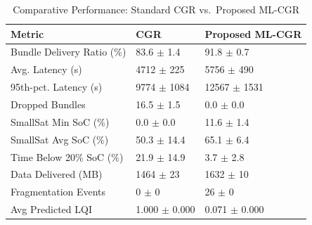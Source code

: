 \begin{table}[t]
\centering
\caption{Comparative Performance: Standard CGR vs.\ Proposed ML-CGR}
\label{tab:results}
\begin{tabular*}{\textwidth}{@{\extracolsep{\fill}}lll}
\hline
\textbf{Metric} & \textbf{CGR} & \textbf{Proposed ML-CGR} \\
\hline
Bundle Delivery Ratio (\%) & 83.6 $\pm$ 1.4 & 91.8 $\pm$ 0.7 \\
Avg. Latency (s) & 4712 $\pm$ 225 & 5756 $\pm$ 490 \\
95th-pct. Latency (s) & 9774 $\pm$ 1084 & 12567 $\pm$ 1531 \\
Dropped Bundles & 16.5 $\pm$ 1.5 & 0.0 $\pm$ 0.0 \\
SmallSat Min SoC (\%) & 0.0 $\pm$ 0.0 & 11.6 $\pm$ 1.4 \\
SmallSat Avg SoC (\%) & 50.3 $\pm$ 14.4 & 65.1 $\pm$ 6.4 \\
Time Below 20\% SoC (\%) & 21.9 $\pm$ 14.9 & 3.7 $\pm$ 2.8 \\
Data Delivered (MB) & 1464 $\pm$ 23 & 1632 $\pm$ 10 \\
Fragmentation Events & 0 $\pm$ 0 & 26 $\pm$ 0 \\
Avg Predicted LQI & 1.000 $\pm$ 0.000 & 0.071 $\pm$ 0.000 \\
\hline
\end{tabular*}
\end{table}
